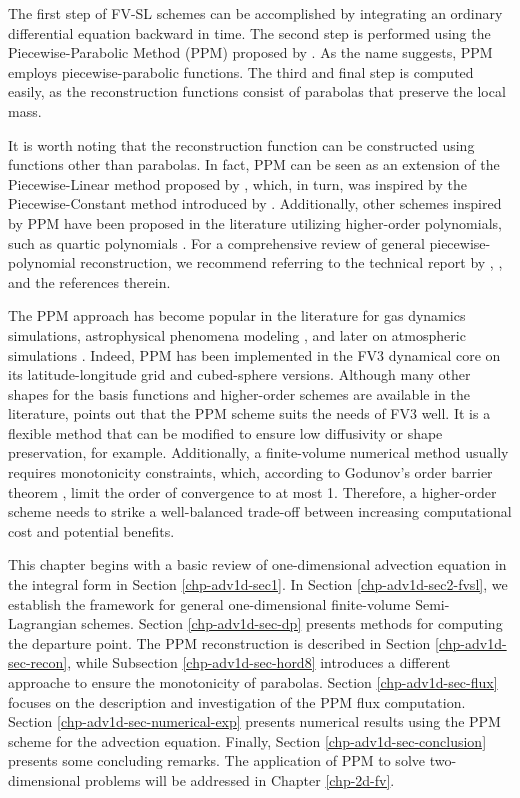 The first step of FV-SL schemes can be accomplished by integrating an ordinary differential
equation backward in time.
The second step is performed using the Piecewise-Parabolic Method (PPM) proposed by \citet{colella:1984}.
As the name suggests, PPM employs piecewise-parabolic functions.
The third and final step is computed easily, as the reconstruction functions consist of parabolas that preserve the local mass.

It is worth noting that the reconstruction function can be constructed using functions other than parabolas.
In fact, PPM can be seen as an
extension of the Piecewise-Linear method proposed by \citet{vanleer:1977}, which,
in turn, was inspired by the Piecewise-Constant method introduced by \citet{godunov:1959}. 
Additionally, other schemes inspired by PPM have been proposed in the literature utilizing
higher-order polynomials, such as quartic polynomials \citep{white:2008}. For a
comprehensive review of general piecewise-polynomial reconstruction, we recommend
referring to the technical report by \citet{engwirda:2016}, \citet{lauritzen:2011}, and the
references therein.

The PPM approach has become popular in the literature for gas dynamics simulations, astrophysical 
phenomena modeling \citep{woodward:1986}, and later on atmospheric simulations \citep{carpenter:1990}. 
Indeed, PPM has been implemented in the FV3 dynamical core on its latitude-longitude grid \citep{lin:2004}
and cubed-sphere \citep{putman:2007} versions.
Although many other shapes for the basis functions and higher-order schemes are available in the literature, 
\citet{harris:2021} points out that the PPM scheme suits the needs of FV3 well. It is a flexible method that
can be modified to ensure low diffusivity or shape preservation, for example.
Additionally, a finite-volume numerical method usually requires monotonicity constraints, which, according 
to Godunov's order barrier theorem \citep{wesseling:2001}, limit the order of convergence to at most 1. 
Therefore, a higher-order scheme needs to strike a well-balanced trade-off between increasing computational 
cost and potential benefits.

This chapter begins with a basic review of one-dimensional advection equation in the integral form
in Section \ref{chp-adv1d-sec1}. In Section \ref{chp-adv1d-sec2-fvsl}, we establish the framework for general
one-dimensional finite-volume Semi-Lagrangian schemes. Section \ref{chp-adv1d-sec-dp} presents
methods for computing the departure point. The PPM reconstruction is described in Section \ref{chp-adv1d-sec-recon},
while Subsection \ref{chp-adv1d-sec-hord8} introduces a different approache to ensure the monotonicity of parabolas.
Section \ref{chp-adv1d-sec-flux} focuses on the description and investigation of the PPM flux computation.
Section \ref{chp-adv1d-sec-numerical-exp}
presents numerical results using the PPM scheme for the advection equation.
Finally, Section \ref{chp-adv1d-sec-conclusion} presents some concluding remarks.
The application of PPM to solve two-dimensional problems will be addressed in Chapter \ref{chp-2d-fv}.

